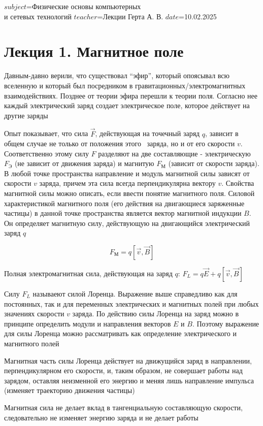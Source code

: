 $subject$=Физические основы компьютерных \\ и сетевых технологий
$teacher$=Лекции Герта А. В.
$date$=10.02.2025

\section{Лекция 1. Магнитное поле}

Давным-давно верили, что существовал \enquote{эфир}, который опоясывал всю вселенную и который был посредником в гравитационных/электромагнитных 
взаимодействиях. Позднее от теории эфира перешли к теории поля. Согласно нее каждый электрический заряд создает электрическое поле, 
которое действует на другие заряды

Опыт показывает, что сила $\vec{F}$, действующая на точечный заряд $q$, зависит в общем случае не только от положения этого \
заряда, но и от его скорости $v$. Соответственно этому силу $F$ разделяют на две составляющие - электрическую $F_\text{Э}$ 
(не зависит от движения заряда) и магнитую $F_\text{М}$ (зависит от скорости заряда). В любой точке пространства направление и модуль
магнитной силы зависят от скорости $v$ заряда, причем эта сила всегда перпендикулярна вектору $v$. Свойства магнитной 
силы можно описать, если ввести понятие магнитного поля. Силовой характеристикой магнитного поля (его действия на двигающиеся заряженные частицы)
в данной точке пространства является вектор магнитной индукции $B$. Он определяет магнитную силу, действующую на двигающийся электрический заряд $q$

\[F_\text{М} = q [\vec{v}, \vec{B}]\]

Полная электромагнитная сила, действующая на заряд $q$: $F_L = q\vec{E} + q[\vec{v}, \vec{B}]$

Силу $F_L$ называеют силой Лоренца. Выражение выше справедливо как для постоянных, так и для переменных
электрических и магнитных полей при любых значениях скорости $v$ заряда. По действию силы Лоренца
на заряд можно в принципе определить модули и направления векторов $E$ и $B$. Поэтому выражение для силы Лоренца
можно рассматривать как определение электрического и магнитного полей

Магнитная часть силы Лоренца действует на движущийся заряд в направлении, перпендикулярном его скорости, и,
таким образом, не совершает работы над зарядом, оставляя неизменной его энергию и меняя лишь направление импульса
(изменяет траекторию движения частицы)

Магнитная сила не делает вклад в тангенциальную составляющую скорости, следовательно не изменяет энергию заряда и не делает работы

